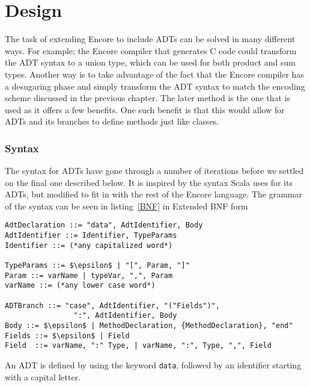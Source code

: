 \documentclass[10pt]{report}
\def\code#1{\texttt{#1}} %
\begin{document}
{\chapter{Design}
\par{The task of extending Encore to include ADTs can be solved in many different ways. For example; the Encore compiler that generates C code could transform the ADT syntax to a union type, which can be used for both product and sum types. Another way is to take advantage of the fact that the Encore compiler has a desugaring phase and simply transform the ADT syntax to match the encoding scheme discussed in the previous chapter. The later method is the one that is used as it offers a few benefits. One such benefit is that this would allow for ADTs and its branches to define methods just like classes.}

\subsection{Syntax}
\par{The syntax for ADTs have gone through a number of iterations before we settled on the final one described below.  It is inspired by the syntax Scala uses for its ADTs, but modified to fit in with the rest of the Encore language. The grammar of the syntax can be seen in listing~\ref{BNF} in Extended BNF form\cite{eBNF}}%

\begin{lstlisting}[language=Encore,caption={Grammar for the suggested syntax},label=BNF,mathescape=true]
AdtDeclaration ::= "data", AdtIdentifier, Body
AdtIdentifier ::= Identifier, TypeParams
Identifier ::= (*any capitalized word*)

TypeParams ::= $\epsilon$ | "[", Param, "]"
Param ::= varName | typeVar, ",", Param
varName ::= (*any lower case word*)

ADTBranch ::= "case", AdtIdentifier, "("Fields")",
                ":", AdtIdentifier, Body
Body ::= $\epsilon$ | MethodDeclaration, {MethodDeclaration}, "end"
Fields ::= $\epsilon$ | Field
Field  ::= varName, ":" Type, | varName, ":", Type, ",", Field
\end{lstlisting}

\par{An ADT is defined by using the keyword \code{data}, followed by an identifier starting with a capital letter.}

}
\end{document}
